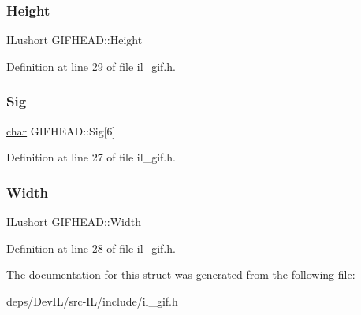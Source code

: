 \subsubsection{\texorpdfstring{Height}{Height}}
{\footnotesize\ttfamily I\+Lushort G\+I\+F\+H\+E\+A\+D\+::\+Height}



Definition at line 29 of file il\+\_\+gif.\+h.

\mbox{\label{structGIFHEAD_a87737cba82a60b15496b2158c38eea15}} 
\subsubsection{\texorpdfstring{Sig}{Sig}}
{\footnotesize\ttfamily \hyperlink{classchar}{char} G\+I\+F\+H\+E\+A\+D\+::\+Sig\mbox{[}6\mbox{]}}



Definition at line 27 of file il\+\_\+gif.\+h.

\mbox{\label{structGIFHEAD_a9277a349d47e07d5b1f8fa52e06ebecb}} 
\subsubsection{\texorpdfstring{Width}{Width}}
{\footnotesize\ttfamily I\+Lushort G\+I\+F\+H\+E\+A\+D\+::\+Width}



Definition at line 28 of file il\+\_\+gif.\+h.



The documentation for this struct was generated from the following file\+:\begin{DoxyCompactItemize}
\item 
deps/\+Dev\+I\+L/src-\/\+I\+L/include/il\+\_\+gif.\+h\end{DoxyCompactItemize}
